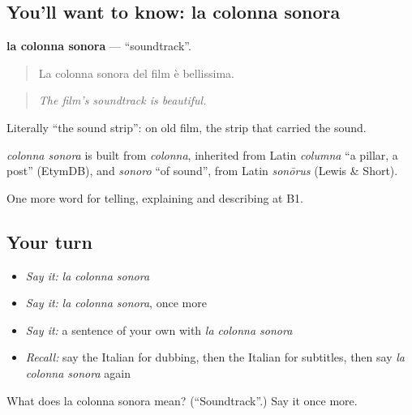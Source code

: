 \subsection*{You'll want to know: la colonna sonora}
\textbf{la colonna sonora} — \textquotedblleft{}soundtrack\textquotedblright{}.

\begin{quote}
La colonna sonora del film è bellissima.
\end{quote}

\begin{quote}
\emph{The film's soundtrack is beautiful.}
\end{quote}

Literally \textquotedblleft{}the sound strip\textquotedblright{}: on old film, the strip that carried the sound.

\begin{cousinweb}
\emph{colonna sonora} is built from \emph{colonna}, inherited from Latin \emph{columna} \textquotedblleft{}a pillar, a post\textquotedblright{} (EtymDB), and \emph{sonoro} \textquotedblleft{}of sound\textquotedblright{}, from Latin \emph{sonōrus} (Lewis \& Short).
\end{cousinweb}

\begin{grammarlens}[title={What you've built}]
One more word for telling, explaining and describing at B1.
\end{grammarlens}

\subsection*{Your turn}
\begin{itemize}
\raggedright
  \item \emph{Say it:} \emph{la colonna sonora}
  \item \emph{Say it:} \emph{la colonna sonora}, once more
  \item \emph{Say it:} a sentence of your own with \emph{la colonna sonora}
  \item \emph{Recall:} say the Italian for dubbing, then the Italian for subtitles, then say \emph{la colonna sonora} again
\end{itemize}

\begin{tcolorbox}[breakable,colback=teal!4,colframe=teal!35!black,title={Before you move on}]
What does la colonna sonora mean? (\textquotedblleft{}Soundtrack\textquotedblright{}.) Say it once more.
\end{tcolorbox}
